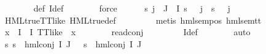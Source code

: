 \begin{isabellebody}
\ \ \ \ \ \ \isamarkupfalse%
\ {\isasymPsi}{\isacharunderscore}{\kern0pt}def\ I{\isacharprime}{\kern0pt}{\isacharunderscore}{\kern0pt}def\isanewline
\ \ \ \ \ \ \isamarkupfalse%
\ force\isanewline
\ \ \ \ \isamarkupfalse%
\ {\isachardoublequoteopen}{\isacharparenleft}{\kern0pt}{\isasymforall}s{\isachardot}{\kern0pt}\ {\isasymforall}j\ {\isasymin}\ J\ {\isasymunion}\ I{\isacharprime}{\kern0pt}{\isachardot}{\kern0pt}\ {\isacharparenleft}{\kern0pt}{\isasymnot}{\isacharparenleft}{\kern0pt}s\ {\isasymTurnstile}\ {\isacharparenleft}{\kern0pt}{\isasymPsi}\ j{\isacharparenright}{\kern0pt}{\isacharparenright}{\kern0pt}\ {\isacharequal}{\kern0pt}\ {\isacharparenleft}{\kern0pt}{\isasymnot}{\isacharparenleft}{\kern0pt}s\ {\isasymTurnstile}\ {\isacharparenleft}{\kern0pt}{\isasymPhi}\ j{\isacharparenright}{\kern0pt}{\isacharparenright}{\kern0pt}{\isacharparenright}{\kern0pt}{\isacharparenright}{\kern0pt}{\isacharparenright}{\kern0pt}{\isachardoublequoteclose}\ \isanewline
\ \ \ \ \ \ \isamarkupfalse%
\ HML{\isacharunderscore}{\kern0pt}true{\isacharunderscore}{\kern0pt}TT{\isacharunderscore}{\kern0pt}like\ HML{\isacharunderscore}{\kern0pt}true{\isacharunderscore}{\kern0pt}def\ \isanewline
\ \ \ \ \ \ \isamarkupfalse%
\ {\isacharparenleft}{\kern0pt}metis\ hml{\isacharunderscore}{\kern0pt}sem{\isacharunderscore}{\kern0pt}pos\ hml{\isacharunderscore}{\kern0pt}sem{\isacharunderscore}{\kern0pt}tt{\isacharparenright}{\kern0pt}\isanewline
\ \ \ \ \isamarkupfalse%
\ {\isachardoublequoteopen}{\isasymforall}x\ {\isasymin}\ {\isacharparenleft}{\kern0pt}I\ {\isacharminus}{\kern0pt}\ I{\isacharprime}{\kern0pt}{\isacharparenright}{\kern0pt}{\isachardot}{\kern0pt}\ TT{\isacharunderscore}{\kern0pt}like\ {\isacharparenleft}{\kern0pt}{\isasymPhi}\ x{\isacharparenright}{\kern0pt}{\isachardoublequoteclose}\isanewline
\ \ \ \ \ \ \isamarkupfalse%
\ read{\isacharunderscore}{\kern0pt}conj\ {}\isanewline
\ \ \ \ \ \ \isamarkupfalse%
\ I{\isacharprime}{\kern0pt}{\isacharunderscore}{\kern0pt}def\isanewline
\ \ \ \ \ \ \isamarkupfalse%
\ auto\isanewline
\ \ \ \ \isamarkupfalse%
\ {\isachardoublequoteopen}{\isacharparenleft}{\kern0pt}{\isasymforall}s{\isachardot}{\kern0pt}\ {\isacharparenleft}{\kern0pt}s\ {\isasymTurnstile}\ hml{\isacharunderscore}{\kern0pt}conj\ I\ J\ {\isasymPhi}{\isacharparenright}{\kern0pt}\ {\isacharequal}{\kern0pt}\ {\isacharparenleft}{\kern0pt}s\ {\isasymTurnstile}\ {\isacharparenleft}{\kern0pt}hml{\isacharunderscore}{\kern0pt}conj\ I{\isacharprime}{\kern0pt}\ J\ {\isasymPhi}{\isacharparenright}{\kern0pt}{\isacharparenright}{\kern0pt}{\isacharparenright}{\kern0pt}{\isachardoublequoteclose}\isanewline

\end{isabellebody}
